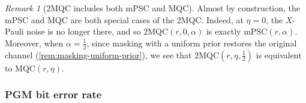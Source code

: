 \documentclass[11pt]{article}
\theoremstyle{remark}
\newtheorem{remark}{Remark}[section]
\newcommand{\MQC}{\mathrm{MQC}}
\newcommand{\mPSC}{\mathrm{mPSC}}
\newcommand{\mMQC}{2\mathrm{MQC}}
\begin{document}
\begin{remark}[2MQC includes both mPSC and MQC]
\label{rem:2mqc-endpoints}
Almost by construction, the mPSC and MQC are both special cases of the 2MQC. Indeed, at $\eta = 0$, the $X$-Pauli noise is no longer there, and so $\mMQC(r,0,\alpha)$ is exactly $\mPSC(r,\alpha)$. Moreover, when $\alpha = \frac{1}{2}$, since masking with a uniform prior restores the original channel (\cref{rem:masking-uniform-prior}), we see that $\mMQC(r,\eta,\frac{1}{2})$ is equivalent to $\MQC(r,\eta)$.
\end{remark}

\subsubsection{PGM bit error rate}
\label{subsubsec:2mqc-pgm-error}
\end{document}
